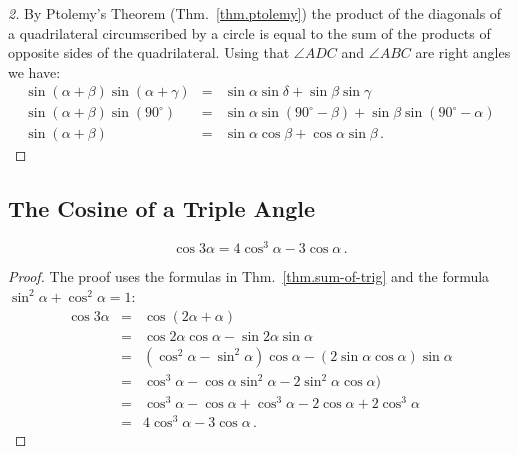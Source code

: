 \begin{proof}[2]
By Ptolemy's Theorem (Thm.~\ref{thm.ptolemy}) the product of the diagonals of a quadrilateral circumscribed by a circle is equal to the sum of the products of opposite sides of the quadrilateral. Using that $\angle ADC$ and $\angle ABC$ are right angles we have:
%
\[
\renewcommand{\arraystretch}{1.3}
\begin{array}{lcl}
\sin (\alpha+\beta)\sin(\alpha+\gamma)&=&
\sin \alpha \sin\delta + \sin \beta\sin \gamma\\
\sin (\alpha+\beta)\sin(90^\circ)&=&
\sin \alpha \sin(90^\circ-\beta) + \sin \beta\sin (90^\circ-\alpha)\\
\sin (\alpha+\beta)&=&\sin\alpha\cos\beta+\cos\alpha\sin \beta\,.
\end{array}
\]
\end{proof}


\subsection{The Cosine of a Triple Angle}\label{s.cosine}
\begin{theorem}\label{thm.triple-angle}
\[
\cos 3\alpha=4\cos^3\alpha -3\cos\alpha\,.
\]
\end{theorem}
\begin{proof}
The proof uses the formulas in Thm.~\ref{thm.sum-of-trig} and the formula $\sin^2\alpha+\cos^2\alpha=1$:
\begin{eqnarray*}
\cos 3\alpha &=& \cos (2\alpha +\alpha)\\
&=& \cos 2\alpha\cos\alpha - \sin 2\alpha\sin\alpha\\
&=& (\cos^2\alpha -\sin^2\alpha)\cos\alpha - (2\sin\alpha\cos\alpha)\sin\alpha\\
&=&\cos^3\alpha - \cos\alpha\sin^2\alpha -2\sin^2\alpha\cos\alpha)\\
&=&\cos^3\alpha - \cos\alpha +\cos^3\alpha -2\cos\alpha+2\cos^3\alpha\\
&=&4\cos^3\alpha -3\cos\alpha\,.
\end{eqnarray*}
\end{proof}


